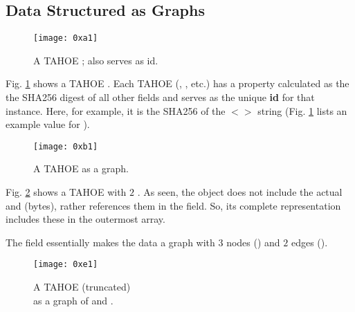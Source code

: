 \fi

















\iffalse





\subsection{Data Structured as Graphs}


\begin{figure}[!ht]
	\texttt{[image: 0xa1]} %
	\centering
	\caption{A TAHOE ;  also serves as id.}
	\label{fig:0xa1}
\end{figure}

Fig. \ref{fig:0xa1} shows a TAHOE . Each TAHOE  (, ,  etc.) has a \textbf{} property calculated as the the SHA256 \cite{dworkin2015sha} digest of all other fields and serves as the unique \textbf{id} for that instance. Here, for example, it is the SHA256 of the $<$$>$ string (Fig. \ref{fig:0xa1} lists an example value for ).

\begin{figure}[!ht]
	\texttt{[image: 0xb1]} %
	\centering
	\caption{A TAHOE  as a graph.}
	\label{fig:0xb1}
\end{figure}

Fig. \ref{fig:0xb1} shows a TAHOE  with $2$ . As seen, the  object does not include the actual  and  (bytes), rather references them in the \textbf{} field. So, its complete representation includes these  in the outermost array.

The  field essentially makes the data a graph with $3$ nodes () and $2$ edges ().

\begin{figure}[!ht]
	\texttt{[image: 0xe1]} %
	\centering
	\caption{A TAHOE  (truncated)\\as a graph of  and .}
	\label{fig:0xe1}
\end{figure}

